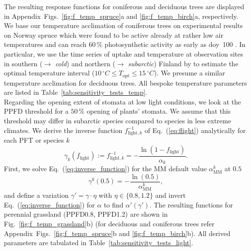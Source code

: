 \documentclass[bg, manuscript]{copernicus}
\begin{document}
The resulting response functions for coniferous and deciduous trees are displayed in Appendix~Figs.~\ref{fig:f_temp_spruce}a and \ref{fig:f_temp_birch}a, respectively. We base our temperature acclimation of coniferous trees on experimental results on Norway spruce which were found to be active already at rather low air temperatures and can reach $60\,\unit{\%}$ photosynthetic activity as early as \unit{doy}~100 \citep{TB:Kolari2007, TP:Wallin2013}. In particular, we use the time series of  uptake and temperature at observation sites in southern ($\rightarrow$ \emph{cold}) and northern ($\rightarrow$ \emph{subarctic}) Finland by \citet{TB:Kolari2007} to estimate the optimal temperature interval ($10\,\unit{^\circ C}\le T_\mathrm{opt} \le 15\,\unit{^\circ C}$). We presume a similar temperature acclimation for deciduous trees. All bespoke temperature parameters are listed in Table~\ref{tab:sensitivity_tests_temp}.\\

Regarding the opening extent of stomata at low light conditions, we look at the PPFD threshold for a $50\,\unit{\%}$ opening of plants' stomata. We assume that this threshold may differ in subarctic species compared to species in less extreme climates. We derive the inverse function $f_{\mathrm{light},k}^{-1}$ of Eq.~(\ref{eq:flight}) analytically for each PFT or species $k$
\begin{equation}
  \gamma_k(f_\mathrm{light}) := f_{\mathrm{light}, k}^{-1} = -\frac{\ln(1-f_\mathrm{light})}{\alpha_k}.
  \label{eq:inverse_function}
\end{equation}
First, we solve Eq.~(\ref{eq:inverse_function}) for the MM default value $\alpha_\mathrm{MM}^k$ at $0.5$ 
\begin{equation}
  \gamma^k(0.5) = -\frac{\ln(0.5)}{\alpha_\mathrm{MM}^k},
  \label{eq:inverse_function_halfway}
\end{equation}
and define a variation $\gamma' = \gamma \cdot \eta$ with $\eta \in \{0.8, 1.2\}$ and invert Eq.~(\ref{eq:inverse_function}) for $\alpha$ to find $\alpha'(\gamma')$. The resulting functions for perennial grassland (PPFD0.8, PPFD1.2) are shown in Fig.~\ref{fig:f_temp_grassland}b) (for deciduous and coniferous trees refer Appendix~Figs.~\ref{fig:f_temp_spruce}b and \ref{fig:f_temp_birch}b). All derived parameters are tabulated in Table~\ref{tab:sensitivity_tests_light}.
\end{document}
